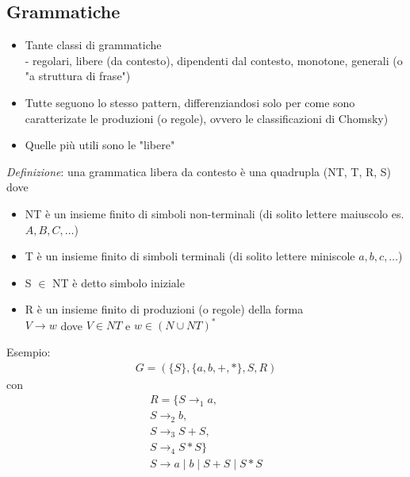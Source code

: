 \documentclass[a4paper,12pt]{article}
\begin{document}
\subsection{Grammatiche}
\begin{itemize}
  \item Tante classi di grammatiche \\ 
  - regolari, libere (da contesto), dipendenti dal contesto, monotone, generali (o "a struttura di frase") 
  \item Tutte seguono lo stesso pattern, differenziandosi solo per come sono caratterizate le produzioni (o regole), ovvero le classificazioni di Chomsky)
  \item Quelle più utili sono le "libere"
\end{itemize}
\textit{Definizione}: una grammatica libera da contesto è una quadrupla (NT, T, R, S) dove 
\begin{itemize}
  \item NT è un insieme finito di simboli non-terminali (di solito lettere maiuscolo es. $A,B,C,\dots$)
  \item T è un insieme finito di simboli terminali (di solito lettere miniscole $a,b,c,\dots$)
  \item S $\in$ NT è detto simbolo iniziale 
  \item R è un insieme finito di produzioni (o regole) della forma \\
  $V \to w$ dove $V \in  NT$ e $w \in (N \cup NT)^*$
\end{itemize}
Esempio: 
\begin{align*}
  G = (\{S\}, \{a,b,+,*\}, S, R) 
\end{align*}
con 
\begin{align*}
  R = \{S \to_1 a, \\
  S \to_2 b, \\ 
  S \to_3 S+S, \\
  S \to_4 S*S \} \\
  \boxed{S \to a \mid b \mid S+S \mid S*S}
\end{align*}
\end{document}

